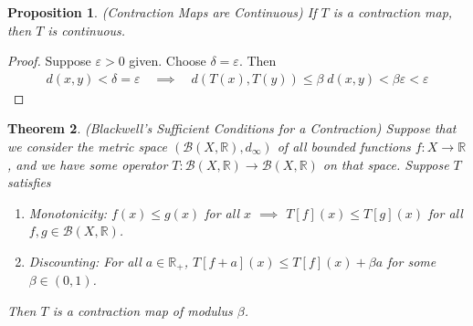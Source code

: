\documentclass[12pt]{article}
\numberwithin{equation}{section} %
\theoremstyle{plain}
\newtheorem{thm}{Theorem}[section]
\newtheorem{prop}[thm]{Proposition}
\theoremstyle{definition}
\theoremstyle{remark}
\newcommand{\ra}{\rightarrow}
\newcommand{\sB}{\mathscr{B}}
\newcommand{\R}{\mathbb{R}}
\begin{document}
\begin{prop}{\emph{(Contraction Maps are Continuous)}}
If $T$ is a contraction map, then $T$ is continuous.
\end{prop}
\begin{proof}
Suppose $\varepsilon>0$ given. Choose $\delta=\varepsilon$. Then
\begin{align*}
  d(x,y) < \delta=\varepsilon
  \quad\implies\quad
  d(T(x),T(y)) \leq \beta \; d(x,y)
  < \beta \varepsilon < \varepsilon
\end{align*}
\end{proof}


\begin{thm}{\emph{(Blackwell's Sufficient Conditions for a Contraction)}}
Suppose that we consider the metric space $(\sB(X,\R),d_\infty)$
of all bounded functions $f:X\ra\R$, and we
have some operator
$T:\mathscr{B}(X,\R)\rightarrow\mathscr{B}(X,\R)$ on that space.
Suppose $T$ satisfies
\begin{enumerate}
  \item \emph{Monotonicity}: $f(x) \leq g(x)$ for all $x$
    $\implies$ $T[f](x) \leq T[g](x)$ for all $f,g\in \sB(X,\R)$.
  \item \emph{Discounting}: For all $a\in\R_+$,
    $T[f+a](x) \leq T[f](x) + \beta a$ for some $\beta\in(0,1)$.
\end{enumerate}
Then $T$ is a contraction map of modulus $\beta$.
\end{thm}
\end{document}
